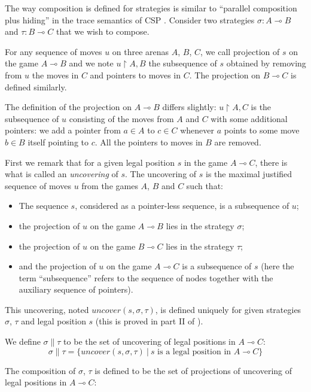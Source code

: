 The way composition is defined for strategies is similar to
``parallel composition plus hiding'' in the trace semantics of CSP
\citep{hoare_csp}. Consider two strategies $\sigma : A \multimap B$
and $\tau : B \multimap C$ that we wish to compose.

For any sequence of moves $u$ on three arenas $A$, $B$, $C$, we call
projection of $s$ on the game $A \multimap B$ and we note $u
\upharpoonright A,B$ the subsequence of $s$ obtained by removing
from $u$ the moves in $C$ and pointers to moves in $C$. The
projection on $B \multimap C$ is defined similarly.

The definition of the projection on $A \multimap B$ differs
slightly: $u \upharpoonright A,C$ is the subsequence of $u$
consisting of the moves from $A$ and $C$ with some additional
pointers: we add a pointer from $a \in A$ to $c\in C$ whenever $a$
points to some move $b \in B$ itself pointing to $c$. All the
pointers to moves in $B$ are removed.


First we remark that for a given legal position $s$ in the game $A
\multimap C$, there is what is called an \emph{uncovering} of $s$.
The uncovering of $s$ is the maximal justified sequence of moves $u$
from the games $A$, $B$ and $C$ such that:
\begin{itemize}
\item The sequence $s$, considered as a pointer-less sequence, is a subsequence of
$u$;
\item the projection of $u$ on the game $A \multimap B$ lies in the
strategy $\sigma$;
\item the projection of $u$ on the game $B \multimap C$
lies in the strategy $\tau$;
\item and the projection of $u$ on the game $A \multimap C$ is a subsequence of $s$ (here the term ``subsequence'' refers to the sequence of nodes together with the auxiliary sequence of pointers).
\end{itemize}
This uncovering, noted $uncover(s, \sigma, \tau)$, is
defined uniquely for given strategies $\sigma$, $\tau$ and legal
position $s$ (this is proved in part II of \cite{hylandong_pcf}).

We define $\sigma \| \tau $ to be the set of uncovering of legal
positions in $A \multimap C$:
$$ \sigma \| \tau = \{ uncover(s, \sigma, \tau) \ | \ s \mbox{ is a legal position in } A \multimap C \}$$

The composition of $\sigma$, $\tau$ is defined to be the set of
projections of uncovering of legal positions in $A \multimap C$:

